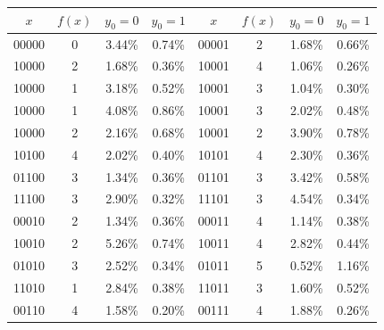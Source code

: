 \documentclass[reqno, 10pt]{amsart}
\numberwithin{equation}{section}                     %
\begin{document}
\begin{table}[ht]
    \begin{tabular}{|c|c|c|c||c|c|c|c|}
        \hline
        $x$ & $f (x)$ & $y_0 = 0$ & $y_0 = 1$ & $x$ & $f (x)$ & $y_0 = 0$ & $y_0 = 1$ \\
        \hline
        00000 & 0 & {\color{ForestGreen} 3.44\%} & {\color{Red} 0.74\%} & 00001 & 2 & {\color{ForestGreen} 1.68\%} & {\color{Red} 0.66\%} \\
        10000 & 2 & {\color{ForestGreen} 1.68\%} & {\color{Red} 0.36\%} & 10001 & 4 & {\color{ForestGreen} 1.06\%} & {\color{Red} 0.26\%} \\
        10000 & 1 & {\color{ForestGreen} 3.18\%} & {\color{Red} 0.52\%} & 10001 & 3 & {\color{ForestGreen} 1.04\%} & {\color{Red} 0.30\%} \\
        10000 & 1 & {\color{ForestGreen} 4.08\%} & {\color{Red} 0.86\%} & 10001 & 3 & {\color{ForestGreen} 2.02\%} & {\color{Red} 0.48\%} \\
        10000 & 2 & {\color{ForestGreen} 2.16\%} & {\color{Red} 0.68\%} & 10001 & 2 & {\color{ForestGreen} 3.90\%} & {\color{Red} 0.78\%} \\
        10100 & 4 & {\color{ForestGreen} 2.02\%} & {\color{Red} 0.40\%} & 10101 & 4 & {\color{ForestGreen} 2.30\%} & {\color{Red} 0.36\%} \\
        01100 & 3 & {\color{ForestGreen} 1.34\%} & {\color{Red} 0.36\%} & 01101 & 3 & {\color{ForestGreen} 3.42\%} & {\color{Red} 0.58\%} \\
        11100 & 3 & {\color{ForestGreen} 2.90\%} & {\color{Red} 0.32\%} & 11101 & 3 & {\color{ForestGreen} 4.54\%} & {\color{Red} 0.34\%} \\
        00010 & 2 & {\color{ForestGreen} 1.34\%} & {\color{Red} 0.36\%} & 00011 & 4 & {\color{ForestGreen} 1.14\%} & {\color{Red} 0.38\%} \\
        10010 & 2 & {\color{ForestGreen} 5.26\%} & {\color{Red} 0.74\%} & 10011 & 4 & {\color{ForestGreen} 2.82\%} & {\color{Red} 0.44\%} \\
        01010 & 3 & {\color{ForestGreen} 2.52\%} & {\color{Red} 0.34\%} & 01011 & 5 & {\color{Red} 0.52\%} & {\color{ForestGreen} 1.16\%} \\
        11010 & 1 & {\color{ForestGreen} 2.84\%} & {\color{Red} 0.38\%} & 11011 & 3 & {\color{ForestGreen} 1.60\%} & {\color{Red} 0.52\%} \\
        00110 & 4 & {\color{ForestGreen} 1.58\%} & {\color{Red} 0.20\%} & 00111 & 4 & {\color{ForestGreen} 1.88\%} & {\color{Red} 0.26\%} \\

\end{tabular}
\end{table}
\end{document}

